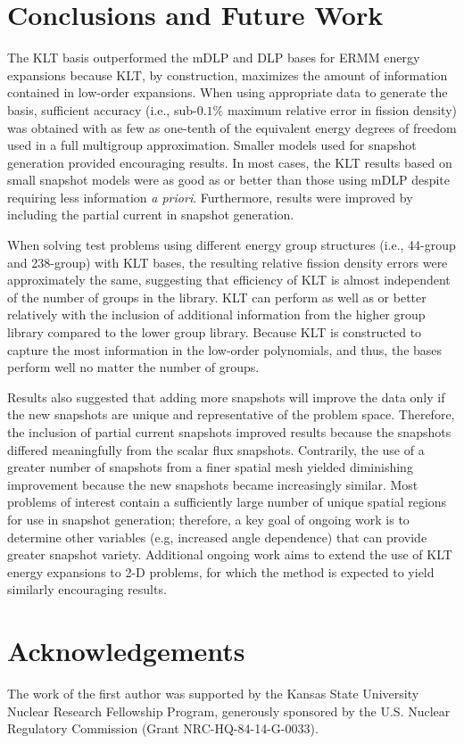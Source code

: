 \documentclass[5p,times,twocolumn,10pt]{elsarticle}
\begin{document}
    \section{Conclusions and Future Work}
    
    The KLT basis outperformed the mDLP and DLP bases for ERMM energy 
    expansions 
    because KLT, by construction, maximizes the amount of information contained 
    in low-order expansions. When using appropriate data to generate the basis, 
    sufficient accuracy (i.e., sub-$0.1\%$ maximum relative error in fission 
    density) was obtained with as few as one-tenth of the equivalent energy 
    degrees of freedom used in a full multigroup approximation. Smaller models 
    used for snapshot generation provided encouraging results. In most cases, 
    the KLT results based on small snapshot models were as good as or better 
than those using mDLP despite requiring less 
    information {\it a priori}. Furthermore, results were improved by including 
    the partial 
    current in snapshot generation.
    
    When solving test problems using different energy group structures (i.e., 
44-group 
    and 238-group) with KLT bases, the resulting relative fission density 
    errors were approximately the same, suggesting 
    that efficiency of KLT is almost independent of the number of groups in the 
    library. KLT can perform as well as or better relatively with the inclusion 
of 
    additional information from the higher group library compared to the lower 
    group library. Because KLT is constructed to capture the most information 
    in the low-order polynomials, and thus, the bases perform well no matter 
    the number of groups.

    Results also suggested that adding more snapshots will improve the data only 
    if the new snapshots are unique and representative of the problem space. 
    Therefore, the inclusion of partial current snapshots improved results 
    because the snapshots differed meaningfully from the scalar flux snapshots. 
    Contrarily, the use of a greater number of snapshots from a finer spatial 
    mesh yielded diminishing improvement because the new snapshots became 
    increasingly similar. Most problems of interest contain a sufficiently 
    large number of unique spatial regions for use in snapshot generation; 
    therefore, a key goal of ongoing work is to determine other variables (e.g, 
    increased angle dependence) that can provide greater snapshot variety. 
    Additional ongoing work aims to extend the use of KLT energy expansions to 
    2-D problems, for which the method is expected to yield similarly 
    encouraging results.
    
    \section{Acknowledgements}
    The work of the first author was supported by the Kansas State University 
Nuclear Research Fellowship Program, generously sponsored by the U.S. Nuclear 
Regulatory Commission (Grant NRC-HQ-84-14-G-0033).
    
    
    
    
    
\end{document}
